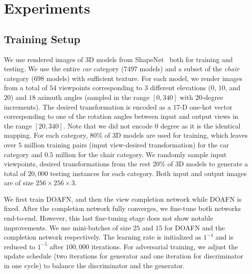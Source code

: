 \documentclass[10pt,twocolumn,letterpaper]{article}
\begin{document}
\section{Experiments}
\subsection{Training Setup}
We use rendered images of 3D models from ShapeNet~\cite{shapenet2015} both for training and testing. We use the entire \emph{car} category ($7497$ models) and a subset of the \emph{chair} category ($698$ models) with sufficient texture. For each model, we render images from a total of $54$ viewpoints corresponding to $3$ different elevations ($0$, $10$, and $20$) and $18$ azimuth angles (sampled in the range $[0,340]$ with $20$-degree increments). The desired transformation is encoded as a 17-D one-hot vector corresponding to one of the rotation angles between input and output views in the range $[20,340]$. Note that we did not encode 0 degree as it is the identical mapping. For each category, 80\% of 3D models are used for training, which leaves over $5$ million training pairs (input view-desired transformation) for the car category and $0.5$ million for the chair category. We randomly sample input viewpoints, desired transformations from the rest 20\% of 3D models to generate a total of $20,000$ testing instances for each category. Both input and output images are of size $256\!\times\!256\!\times\!3$. 

We first train DOAFN, and then the view completion network while DOAFN is fixed. After the completion network fully converges, we fine-tune both networks end-to-end. However, this last fine-tuning stage does not show notable improvements. We use mini-batches of size $25$ and $15$ for DOAFN and the completion network respectively. The learning rate is initialized as $1^{-4}$ and is reduced to $1^{-5}$ after $100,000$ iterations. For adversarial training, we adjust the update schedule (two iterations for generator and one iteration for discriminator in one cycle) to balance the discriminator and the generator.
\end{document}
